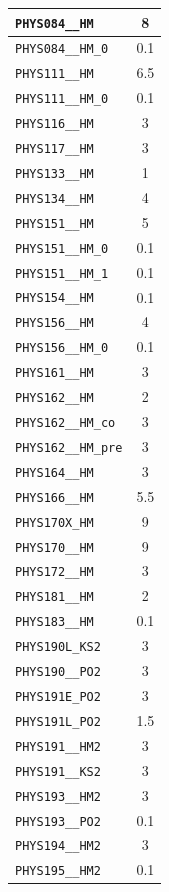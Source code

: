 \begin{longtable}{|p{}|c|}
    \verb|PHYS084__HM| & 8\\\hline
    \verb|PHYS084__HM_0| & 0.1\\\hline
    \verb|PHYS111__HM| & 6.5\\\hline
    \verb|PHYS111__HM_0| & 0.1\\\hline
    \verb|PHYS116__HM| & 3\\\hline
    \verb|PHYS117__HM| & 3\\\hline
    \verb|PHYS133__HM| & 1\\\hline
    \verb|PHYS134__HM| & 4\\\hline
    \verb|PHYS151__HM| & 5\\\hline
    \verb|PHYS151__HM_0| & 0.1\\\hline
    \verb|PHYS151__HM_1| & 0.1\\\hline
    \verb|PHYS154__HM| & 0.1\\\hline
    \verb|PHYS156__HM| & 4\\\hline
    \verb|PHYS156__HM_0| & 0.1\\\hline
    \verb|PHYS161__HM| & 3\\\hline
    \verb|PHYS162__HM| & 2\\\hline
    \verb|PHYS162__HM_co| & 3\\\hline
    \verb|PHYS162__HM_pre| & 3\\\hline
    \verb|PHYS164__HM| & 3\\\hline
    \verb|PHYS166__HM| & 5.5\\\hline
    \verb|PHYS170X_HM| & 9\\\hline
    \verb|PHYS170__HM| & 9\\\hline
    \verb|PHYS172__HM| & 3\\\hline
    \verb|PHYS181__HM| & 2\\\hline
    \verb|PHYS183__HM| & 0.1\\\hline
    \verb|PHYS190L_KS2| & 3\\\hline
    \verb|PHYS190__PO2| & 3\\\hline
    \verb|PHYS191E_PO2| & 3\\\hline
    \verb|PHYS191L_PO2| & 1.5\\\hline
    \verb|PHYS191__HM2| & 3\\\hline
    \verb|PHYS191__KS2| & 3\\\hline
    \verb|PHYS193__HM2| & 3\\\hline
    \verb|PHYS193__PO2| & 0.1\\\hline
    \verb|PHYS194__HM2| & 3\\\hline
    \verb|PHYS195__HM2| & 0.1\\\hline

\end{longtable}
